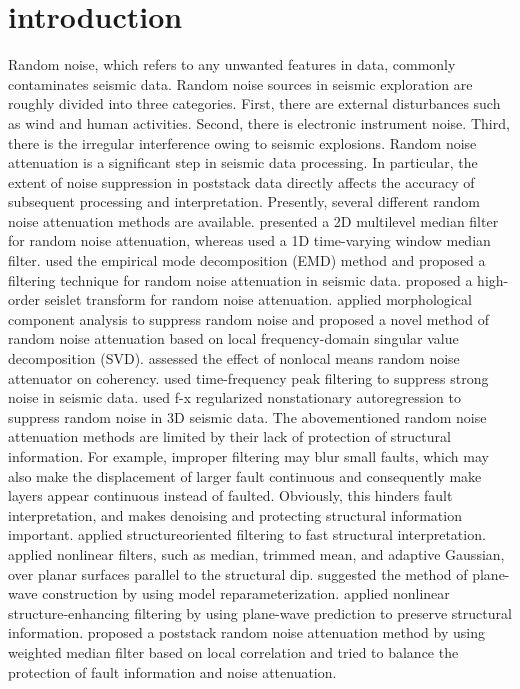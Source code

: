 \section{introduction}

Random noise, which refers to any unwanted features in data, commonly
contaminates seismic data. Random noise sources in seismic exploration
are roughly divided into three categories. First, there are external
disturbances such as wind and human activities. Second, there is
electronic instrument noise. Third, there is the irregular
interference owing to seismic explosions.  Random noise attenuation is
a significant step in seismic data processing. In particular, the
extent of noise suppression in poststack data directly affects the
accuracy of subsequent processing and interpretation.  Presently,
several different random noise attenuation methods are
available. \cite{Liu06} presented a 2D multilevel median filter for
random noise attenuation, whereas \cite{liu091} used a 1D time-varying
window median filter. \cite{Bekara09} used the empirical mode
decomposition (EMD) method and proposed a filtering technique for
random noise attenuation in seismic data. \cite{Liu09} proposed a
high-order seislet transform for random noise attenuation. \cite{Li12}
applied morphological component analysis to suppress random noise and
\cite{Liu12} proposed a novel method of random noise attenuation based
on local frequency-domain singular value decomposition
(SVD). \cite{Maraschini13} assessed the effect of nonlocal means
random noise attenuator on coherency. \cite{Li13} used time-frequency
peak filtering to suppress strong noise in seismic data. \cite{Liu13}
used f-x regularized nonstationary autoregression to suppress random
noise in 3D seismic data. The abovementioned random noise attenuation
methods are limited by their lack of protection of structural
information. For example, improper filtering may blur small faults,
which may also make the displacement of larger fault continuous and
consequently make layers appear continuous instead of
faulted. Obviously, this hinders fault interpretation, and makes
denoising and protecting structural information
important. \cite{Fehmers03} applied structureoriented filtering to
fast structural interpretation. \cite{Hoeber06} applied nonlinear
filters, such as median, trimmed mean, and adaptive Gaussian, over
planar surfaces parallel to the structural dip. \cite{Fomel06}
suggested the method of plane-wave construction by using model
reparameterization. \cite{Liu10} applied nonlinear structure-enhancing
filtering by using plane-wave prediction to preserve structural
information. \cite{Liu11} proposed a poststack random noise
attenuation method by using weighted median filter based on local
correlation and tried to balance the protection of fault information
and noise attenuation.

